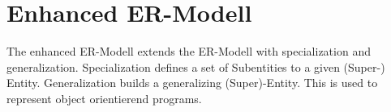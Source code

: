 \section{Enhanced ER-Modell}
The enhanced ER-Modell extends the ER-Modell with specialization and
generalization. Specialization defines a set of Subentities to a given (Super-)
Entity. Generalization builds a generalizing (Super)-Entity. This is used to
represent object orientierend programs.\\
